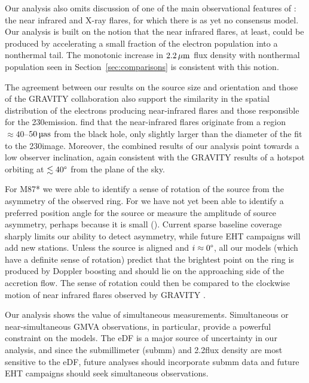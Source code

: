 Our analysis also omits discussion of one of the main observational features of \sgra: the near infrared and X-ray flares, for which there is as yet no consensus model.
Our analysis is built on the notion that the near infrared flares, at least, could be produced by accelerating a small fraction of the electron population into a nonthermal tail.
The monotonic increase in $2.2\,\mu\mathrm{m}$ flux density with nonthermal population seen in Section~\ref{sec:comparisons} is consistent with this notion.

The agreement between our results on the source size and orientation and those of the GRAVITY collaboration \citep{2018A&A...618L..10G} also support the similarity in the spatial distribution of the electrons producing near-infrared flares and those responsible for the 230\GHz emission.
\citealt{2018A&A...618L..10G} find that the near-infrared flares originate from a region $\approx 40$--$50\uas$ from the black hole, only slightly larger than the diameter of the \mring fit to the 230\GHz image.
Moreover, the combined results of our analysis point towards a low observer inclination, again consistent with the GRAVITY results of a hotspot orbiting at $\lesssim 40\degree$ from the plane of the sky.

For M87* we were able to identify a sense of rotation of the source from the asymmetry of the observed ring.
For \sgra we have not yet been able to identify a preferred position angle for the source or measure the amplitude of source asymmetry, perhaps because it is small ().
Current sparse baseline coverage sharply limits our ability to detect asymmetry, while future EHT campaigns will add new stations.
Unless the source is aligned and $i \approx 0\degree$, all our models (which have a definite sense of rotation) predict that the brightest point on the ring is produced by Doppler boosting and should lie on the approaching side of the accretion flow.
The sense of rotation could then be compared to the clockwise motion of near infrared flares observed by GRAVITY \citep{2018A&A...618L..10G}.

Our analysis shows the value of simultaneous measurements.
Simultaneous or near-simultaneous GMVA observations, in particular, provide a powerful constraint on the models.
The eDF is a major source of uncertainty in our analysis, and since the submillimeter (submm) and 2.2\um flux density are most sensitive to the eDF, future analyses should incorporate submm data and future EHT campaigns should seek simultaneous observations.

